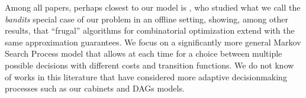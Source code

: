Among all papers, perhaps closest to our model is \citet{gupta2019markovian}, who studied what we call the \emph{bandits} special case of our problem in an offline setting, showing, among other results, that ``frugal'' algorithms for combinatorial optimization extend with the same approximation guarantees.
We focus on a significantly more general Markov Search Process model that allows at each time for a choice between multiple possible decisions with different costs and transition functions.
We do not know of works in this literature that have considered more adaptive decisionmaking processes such as our cabinets and DAGs models.


